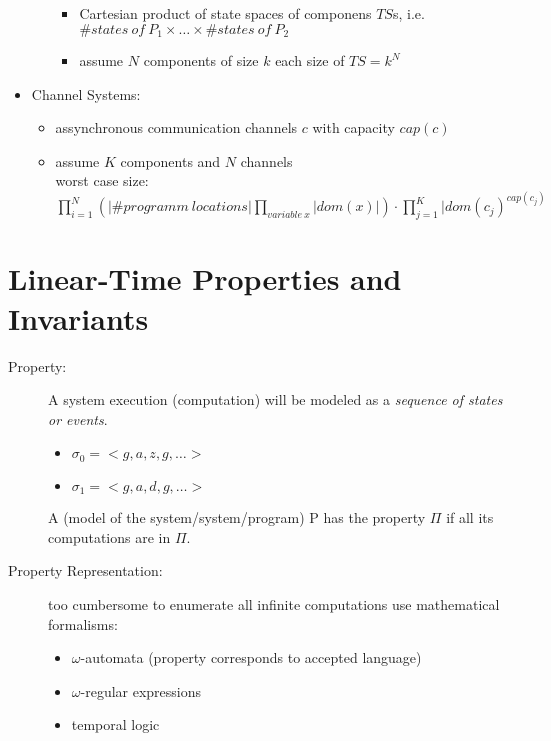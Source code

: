 \documentclass[a4paper, 10pt]{article}
\begin{document}
\begin{itemize}
\begin{itemize}
        \begin{itemize}
            \item Cartesian product of state spaces of componens $TS$s, i.e. $\#states\ of \ P_1\times \dots \times \#states\ of \ P_2$
            \item assume $N$ components of size $k$ each \follows size of $TS=k^N$
        \end{itemize}
    \end{itemize}
    \item Channel Systems:
    \begin{itemize}
        \item assynchronous communication channels $c$ with capacity $cap(c)$
        \item assume $K$ components and $N$ channels
        \\ \follows worst case size: $\displaystyle \prod^N_{i=1} \left(|\#programm\ locations| \prod_{variable\ x} |dom(x)|\right)\cdot\prod^K_{j=1}|dom(c_j)^{cap(c_j)}$
    \end{itemize}
\end{itemize}

\section*{Linear-Time Properties and Invariants}
\begin{description}
    \item[Property:] A system execution (computation) will be modeled as a \emph{sequence of states or events}.
    \begin{itemize}
        \item $\sigma_0 = <g,a,z,g,\dots>$
        \item $\sigma_1 = <g,a,d,g,\dots>$
    \end{itemize}
    \begin{shaded}
        A (model of the system/system/program) P has the property $\Pi$ if all its computations are in $\Pi$.
    \end{shaded}
    \item[Property Representation:] too cumbersome to enumerate all infinite computations \follows use mathematical formalisms:
    \begin{itemize}
        \item $\omega$-automata (property corresponds to accepted language)
        \item $\omega$-regular expressions
        \item temporal logic
    \end{itemize}
\end{description}
\end{document}

